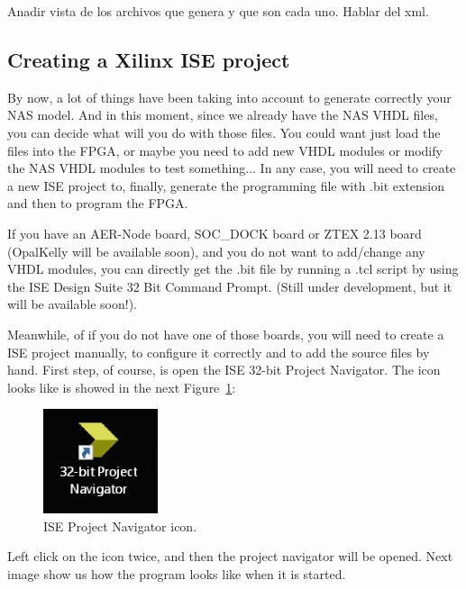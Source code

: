 Anadir vista de los archivos que genera y que son cada uno. Hablar del xml.




\subsection{Creating a Xilinx ISE project}

By now, a lot of things have been taking into account to generate correctly your NAS model. And in this moment, since we already have the NAS VHDL files, you can decide what will you do with those files. You could want just load the files into the FPGA, or maybe you need to add new VHDL modules or modify the NAS VHDL modules to test something... In any case, you will need to create a new ISE project to, finally, generate the programming file with .bit extension and then to program the FPGA.

If you have an AER-Node board, SOC\_DOCK board or ZTEX 2.13 board (OpalKelly will be available soon), and you do not want to add/change any VHDL modules, you can directly get the .bit file by running a .tcl script by using the ISE Design Suite 32 Bit Command Prompt. (Still under development, but it will be available soon!).

Meanwhile, of if you do not have one of those boards, you will need to create a ISE project manually, to configure it correctly and to add the source files by hand. First step, of course, is open the ISE 32-bit Project Navigator. The icon looks like is showed in the next Figure~\ref{fig:ISE_icon}:

\begin{figure}[H]
\centering
\includegraphics[width=0.3\textwidth]{images/Img26_FindISE.PNG}
\caption{\label{fig:ISE_icon}ISE Project Navigator icon.}
\end{figure}

Left click on the icon twice, and then the project navigator will be opened. Next image show us how the program looks like when it is started.

